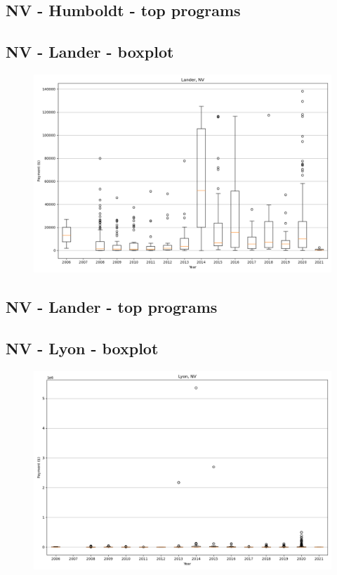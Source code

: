 \subsection*{NV - Humboldt - top programs}

\newpage
\subsection*{NV - Lander - boxplot}
\begin{figure}[h]
\centering
\includegraphics[width=7in]{../output/boxplots/counties/Lander-NV_boxplot.png}
\end{figure}


\subsection*{NV - Lander - top programs}

\newpage
\subsection*{NV - Lyon - boxplot}
\begin{figure}[h]
\centering
\includegraphics[width=7in]{../output/boxplots/counties/Lyon-NV_boxplot.png}
\end{figure}


